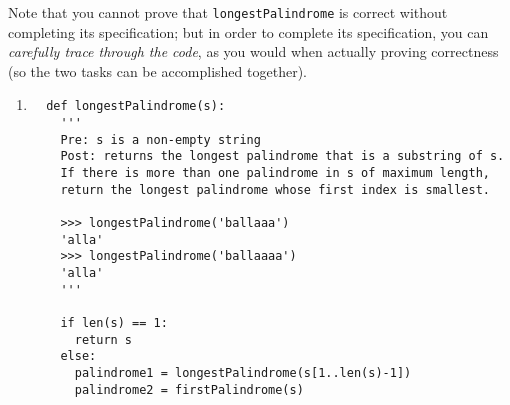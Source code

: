 \documentclass[12pt]{article}
\begin{document}
  Note that you cannot prove that \texttt{longestPalindrome} is correct without completing its specification; but in order to complete its specification, you can \emph{carefully trace through the code}, as you would when actually proving correctness (so the two tasks can be accomplished together).
  
 \begin{enumerate}
  
\item
 \begin{small}
  \begin{verbatim}
  def longestPalindrome(s):
    ''' 
    Pre: s is a non-empty string
    Post: returns the longest palindrome that is a substring of s.
    If there is more than one palindrome in s of maximum length, 
    return the longest palindrome whose first index is smallest.
 
    >>> longestPalindrome('ballaaa')
    'alla'
    >>> longestPalindrome('ballaaaa')
    'alla'
    '''
    
    if len(s) == 1:
      return s
    else:
      palindrome1 = longestPalindrome(s[1..len(s)-1])
      palindrome2 = firstPalindrome(s)
      

\end{verbatim}
\end{small}
\end{enumerate}
\end{document}
